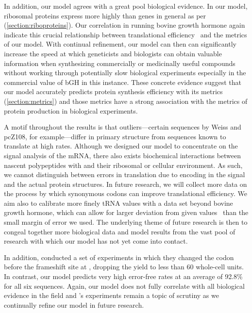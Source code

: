 \documentclass[12pt, draft]{article}
\numberwithin{equation}{section}
\begin{document}
In addition, our model agrees with a great pool biological
evidence. In our model, ribosomal proteins express more highly than
genes in general as per \citet{rpoS:process}
(\autoref{section:riboproteins}).  Our correlation in running bovine
growth hormone again indicate this crucial relationship between
translational efficiency~\cite{schoner:bgh} and the metrics of our
model. With continual refinement, our model can then can significantly
increase the speed at which geneticists and biologists can obtain
valuable information when synthesizing commercially or medicinally
useful compounds without working through potentially slow biological
experiments especially in the commercial value of bGH in this
instance.  These concrete evidence suggest that our model
accurately predicts protein synthesis efficiency with its metrics
(\autoref{section:metrics}) and those metrics have a strong
association with the metrics of protein production in biological experiments.

A motif throughout the results is that outliers---certain sequences by
Weiss and pcZ108, for example---differ in primary structure from
sequences known to translate at high rates. Although we designed our
model to concentrate on the signal analysis of the mRNA, there also
exists biochemical interactions between nascent polypeptides with and
their ribosomal or cellular environment.  As such, we cannot
distinguish between errors in translation due to encoding in the
signal and the actual protein structures. In future research, we will
collect more data on the process by which synonymous codons can
improve translational efficiency. We aim also to calibrate more finely
tRNA values with a data set beyond bovine growth hormone, which can
allow for larger deviation from given values~\cite{lalit:embs} than
the small margin of error we used. The underlying theme of future
research is then to congeal together more biological data and model
results from the vast pool of research with which our model has not
yet come into contact.

In addition, \citet{weiss87} conducted a set of experiments in which
they changed the codon before the frameshift site at {},
dropping the yield to less than 60 whole-cell units. In contrast,
our model predicts very high error-free rates at an average of 92.8\%
for all six sequences. Again, our model does not fully correlate with
all biological evidence in the field and \citeauthor{weiss87}'s
experiments remain a topic of scrutiny as we continually refine our
model in future research.
\end{document}
